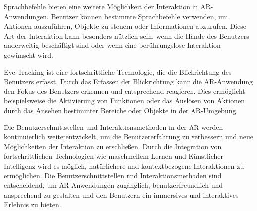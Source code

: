 Sprachbefehle bieten eine weitere Möglichkeit der Interaktion in
AR-Anwendungen. Benutzer können bestimmte Sprachbefehle verwenden, um Aktionen
auszuführen, Objekte zu steuern oder Informationen abzurufen. Diese Art der
Interaktion kann besonders nützlich sein, wenn die Hände des Benutzers
anderweitig beschäftigt sind oder wenn eine berührungslose Interaktion
gewünscht wird.

Eye-Tracking ist eine fortschrittliche Technologie, die die Blickrichtung des
Benutzers erfasst. Durch das Erfassen der Blickrichtung kann die AR-Anwendung
den Fokus des Benutzers erkennen und entsprechend reagieren. Dies ermöglicht
beispielsweise die Aktivierung von Funktionen oder das Auslösen von Aktionen
durch das Ansehen bestimmter Bereiche oder Objekte in der AR-Umgebung.

Die Benutzerschnittstellen und Interaktionsmethoden in der AR werden
kontinuierlich weiterentwickelt, um die Benutzererfahrung zu verbessern und
neue Möglichkeiten der Interaktion zu erschließen. Durch die Integration von
fortschrittlichen Technologien wie maschinellem Lernen und Künstlicher
Intelligenz wird es möglich, natürlichere und kontextbezogene Interaktionen zu
ermöglichen. Die Benutzerschnittstellen und Interaktionsmethoden sind
entscheidend, um AR-Anwendungen zugänglich, benutzerfreundlich und ansprechend
zu gestalten und den Benutzern ein immersives und interaktives Erlebnis zu
bieten.